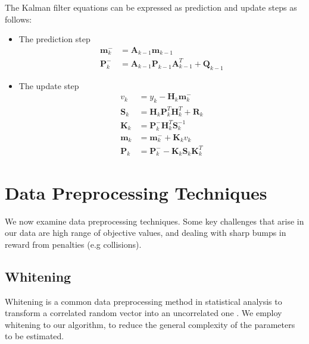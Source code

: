 The Kalman filter equations can be expressed as
prediction and update steps as follows:
\begin{itemize}
\item The prediction step
  \begin{equation}
    \label{KF_prediction}
    \begin{aligned}
      \mathbf{m}_k^- &= \mathbf{A}_{k-1} \mathbf{m}_{k-1} \\
      \mathbf{P}_k^- &= \mathbf{A}_{k-1} \mathbf{P}_{k-1} \mathbf{A}^T_{k-1}
      + \mathbf{Q}_{k-1}
    \end{aligned}
  \end{equation}

\item The update step
  \begin{equation}
    \label{KF_update}
    \begin{aligned}
      v_k &= y_k - \mathbf{H}_k \mathbf{m}_k^- \\
      \mathbf{S}_k &= \mathbf{H}_k \mathbf{P}_k^T \mathbf{H}^T_k +
      \mathbf{R}_k \\
      \mathbf{K}_k &= \mathbf{P}_k^- \mathbf{H}_k^T \mathbf{S}_k^{-1} \\
      \mathbf{m}_k &= \mathbf{m}_k^- + \mathbf{K}_k v_k \\
      \mathbf{P}_k &= \mathbf{P}_k^- - \mathbf{K}_k \mathbf{S}_k \mathbf{K}_k^T
    \end{aligned}
  \end{equation}
\end{itemize}


\section{Data Preprocessing Techniques}
We now examine data preprocessing techniques. Some key challenges
that arise in our data  are
high range of objective values,
and dealing with sharp bumps in reward from
penalties (e.g collisions).

\subsection{Whitening}
\label{sec:whitening}
Whitening is a common data preprocessing method in statistical analysis
to transform a correlated random vector into an uncorrelated one
\citep{kessy2018optimal}.
We employ whitening to our algorithm, to reduce the general complexity of the
parameters to be estimated. 

